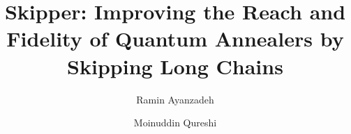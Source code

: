 \documentclass[nonacm,sigplan]{acmart}
\begin{document}
\title{
  Skipper: Improving the Reach and Fidelity of Quantum Annealers by Skipping Long Chains
  }

\author{Ramin Ayanzadeh} 

\author{Moinuddin Qureshi} 



\maketitle %
\pagestyle{plain} %









% 







% 


\clearpage


\end{document}
